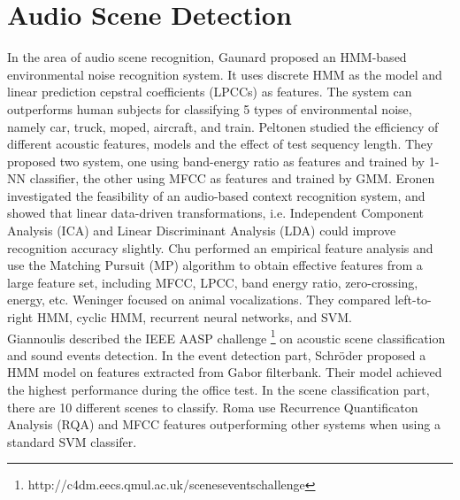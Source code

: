 \section{Audio Scene Detection}
In the area of audio scene recognition, Gaunard \cite{gaunard1998automatic} proposed an HMM-based environmental noise recognition system. 
It uses discrete HMM as the model and linear prediction cepstral coefficients (LPCCs) as features. 
The system can outperforms human subjects for classifying 5 types of environmental noise, namely car, truck, moped, aircraft, and train. 
Peltonen \cite{peltonen2001computational} studied the efficiency of different acoustic features, models and the effect of test sequency length. 
They proposed two system, one using band-energy ratio as features and trained by 1-NN classifier, the other using MFCC as features and trained by GMM. 
Eronen  \cite{eronen2006audio-based} investigated the feasibility of an audio-based context recognition system, and showed that linear data-driven transformations, i.e. Independent   Component Analysis (ICA) and Linear Discriminant Analysis (LDA) could improve recognition accuracy slightly. 
Chu \cite{chu2009environmental} performed an empirical feature analysis and use the Matching Pursuit (MP) algorithm to obtain effective features from a large feature set, including MFCC, LPCC, band energy ratio, zero-crossing, energy, etc. 
Weninger \cite{weninger2011audio} focused on animal vocalizations. They compared left-to-right HMM, cyclic HMM, recurrent neural networks, and SVM. \\

Giannoulis \cite{giannoulis2013applications} described the IEEE AASP challenge \footnote{http://c4dm.eecs.qmul.ac.uk/sceneseventschallenge} on acoustic scene classification and sound events detection.  
In the event detection part, Schr\"{o}der \cite{schroder2013acoustic} proposed a HMM model on features extracted from Gabor filterbank. 
Their model achieved the highest performance during the office test.   
In the scene classification part, there are 10 different scenes to classify. 
Roma \cite{romarecurrence} use Recurrence Quantificaton Analysis (RQA) and MFCC features outperforming other systems when using a standard SVM classifer. 

